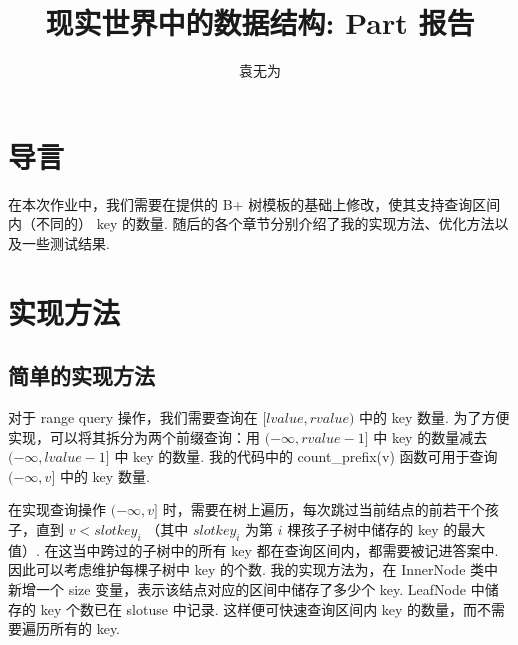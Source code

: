 \documentclass[10pt,letterpaper]{article}
\begin{document}
\title{现实世界中的数据结构: Part \uppercase\expandafter{} 报告}

\author{袁无为\\
}

\maketitle


\section {导言}

在本次作业中，我们需要在提供的 B+ 树模板的基础上修改，使其支持查询区间内（不同的） key 的数量. 随后的各个章节分别介绍了我的实现方法、优化方法以及一些测试结果.

\section {实现方法}

\subsection {简单的实现方法}

对于 range query 操作，我们需要查询在 $[lvalue, rvalue)$ 中的 key 数量. 为了方便实现，可以将其拆分为两个前缀查询：用 $(-\infty, rvalue - 1]$ 中 key 的数量减去 $(-\infty, lvalue - 1]$ 中 key 的数量. 我的代码中的 count\_prefix(v) 函数可用于查询 $(-\infty, v]$ 中的 key 数量.

在实现查询操作 $(-\infty, v]$ 时，需要在树上遍历，每次跳过当前结点的前若干个孩子，直到 $v < slotkey_{i}$ （其中 $slotkey_{i}$ 为第 $i$ 棵孩子子树中储存的 key 的最大值）. 在这当中跨过的子树中的所有 key 都在查询区间内，都需要被记进答案中. 因此可以考虑维护每棵子树中 key 的个数. 我的实现方法为，在 InnerNode 类中新增一个 size 变量，表示该结点对应的区间中储存了多少个 key. LeafNode 中储存的 key 个数已在 slotuse 中记录. 这样便可快速查询区间内 key 的数量，而不需要遍历所有的 key.
\end{document}
